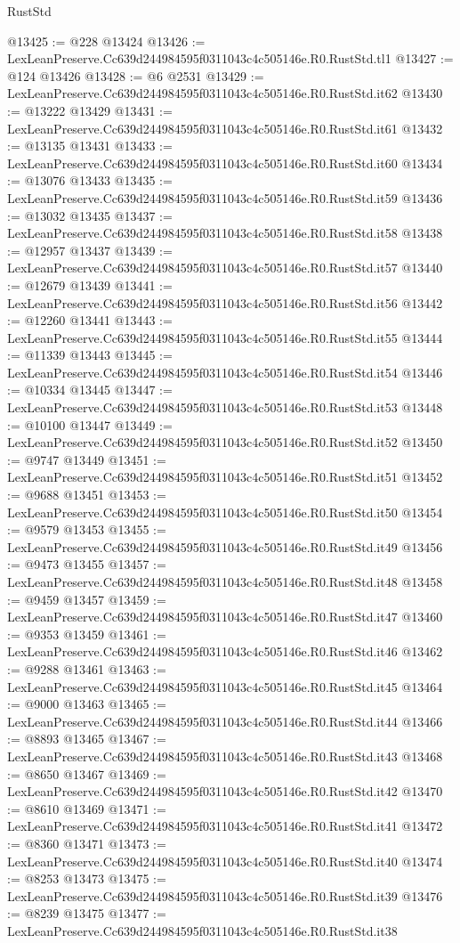 \begin{lexlean}{RustStd}
\begin{coremodule}
@13425 := @228 @13424
@13426 := LexLeanPreserve.Cc639d244984595f0311043c4c505146e.R0.RustStd.tl1
@13427 := @124 @13426
@13428 := @6 @2531
@13429 := LexLeanPreserve.Cc639d244984595f0311043c4c505146e.R0.RustStd.it62
@13430 := @13222 @13429
@13431 := LexLeanPreserve.Cc639d244984595f0311043c4c505146e.R0.RustStd.it61
@13432 := @13135 @13431
@13433 := LexLeanPreserve.Cc639d244984595f0311043c4c505146e.R0.RustStd.it60
@13434 := @13076 @13433
@13435 := LexLeanPreserve.Cc639d244984595f0311043c4c505146e.R0.RustStd.it59
@13436 := @13032 @13435
@13437 := LexLeanPreserve.Cc639d244984595f0311043c4c505146e.R0.RustStd.it58
@13438 := @12957 @13437
@13439 := LexLeanPreserve.Cc639d244984595f0311043c4c505146e.R0.RustStd.it57
@13440 := @12679 @13439
@13441 := LexLeanPreserve.Cc639d244984595f0311043c4c505146e.R0.RustStd.it56
@13442 := @12260 @13441
@13443 := LexLeanPreserve.Cc639d244984595f0311043c4c505146e.R0.RustStd.it55
@13444 := @11339 @13443
@13445 := LexLeanPreserve.Cc639d244984595f0311043c4c505146e.R0.RustStd.it54
@13446 := @10334 @13445
@13447 := LexLeanPreserve.Cc639d244984595f0311043c4c505146e.R0.RustStd.it53
@13448 := @10100 @13447
@13449 := LexLeanPreserve.Cc639d244984595f0311043c4c505146e.R0.RustStd.it52
@13450 := @9747 @13449
@13451 := LexLeanPreserve.Cc639d244984595f0311043c4c505146e.R0.RustStd.it51
@13452 := @9688 @13451
@13453 := LexLeanPreserve.Cc639d244984595f0311043c4c505146e.R0.RustStd.it50
@13454 := @9579 @13453
@13455 := LexLeanPreserve.Cc639d244984595f0311043c4c505146e.R0.RustStd.it49
@13456 := @9473 @13455
@13457 := LexLeanPreserve.Cc639d244984595f0311043c4c505146e.R0.RustStd.it48
@13458 := @9459 @13457
@13459 := LexLeanPreserve.Cc639d244984595f0311043c4c505146e.R0.RustStd.it47
@13460 := @9353 @13459
@13461 := LexLeanPreserve.Cc639d244984595f0311043c4c505146e.R0.RustStd.it46
@13462 := @9288 @13461
@13463 := LexLeanPreserve.Cc639d244984595f0311043c4c505146e.R0.RustStd.it45
@13464 := @9000 @13463
@13465 := LexLeanPreserve.Cc639d244984595f0311043c4c505146e.R0.RustStd.it44
@13466 := @8893 @13465
@13467 := LexLeanPreserve.Cc639d244984595f0311043c4c505146e.R0.RustStd.it43
@13468 := @8650 @13467
@13469 := LexLeanPreserve.Cc639d244984595f0311043c4c505146e.R0.RustStd.it42
@13470 := @8610 @13469
@13471 := LexLeanPreserve.Cc639d244984595f0311043c4c505146e.R0.RustStd.it41
@13472 := @8360 @13471
@13473 := LexLeanPreserve.Cc639d244984595f0311043c4c505146e.R0.RustStd.it40
@13474 := @8253 @13473
@13475 := LexLeanPreserve.Cc639d244984595f0311043c4c505146e.R0.RustStd.it39
@13476 := @8239 @13475
@13477 := LexLeanPreserve.Cc639d244984595f0311043c4c505146e.R0.RustStd.it38

\end{coremodule}
\end{lexlean}
